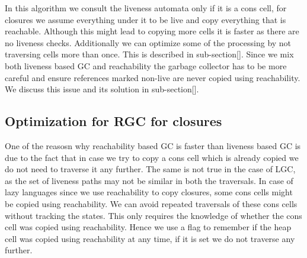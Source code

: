 \documentclass[9pt]{sigplanconf}
\newcommand{\comment}[1]{{\color{Myblue}{(#1)}}}
\newcommand{\cred}[1]{{\color{red}{#1}}}
\begin{document}
In this algorithm we consult the liveness automata only if it is a cons cell, for closures we 
assume everything under it to be live and copy everything that is reachable. Although this might 
lead to copying more cells it is faster as there are no liveness checks. Additionally we can 
optimize some of the processing by not traversing cells more than once. This is described in 
sub-section[]. \comment{Once experimental results are obtained compare the two algorithms here}
Since we mix both liveness based GC and reachability the garbage collector has to be more careful 
and ensure references marked non-live are never copied using reachability. We discuss this issue 
and its solution in sub-section[]\comment{hanging like a sore thumb}.

\subsection{Optimization for RGC for closures}
One of the  reasosn why reachability based GC  is faster than liveness
based GC is  due to the fact that  in case we try to copy  a cons cell
which is  already copied  we do  not need to  traverse it  any further.
 The  same is not true in the case  of LGC, as the set
of  liveness paths  may not  be similar  in both  the
traversals. \cred{Push earlier: One
optimization is  to keep  track of all  the liveness  automaton states
that a particular  cons cell has been visited with  and ensure that we
do  not  traverse  it  with  the  same state  more  than  once.   This
optimization requires extra memory  for each heap cell and potentially
it can hold  all the automata states.  Therefore it  is not a feasible
solution.} In case of lazy  languages since we use reachability to copy
closures, some cons  cells might be copied using  reachability. We can
avoid  repeated traversals of  these cons  cells without  tracking the
states. This only requires the  knowledge of whether the cons cell was
copied using  reachability.  Hence  we use a  flag to remember  if the
heap cell was  copied using reachability at any time, if  it is set we
do not traverse any further.\comment{Maybe add a diagram to make it clearer}
\end{document}
